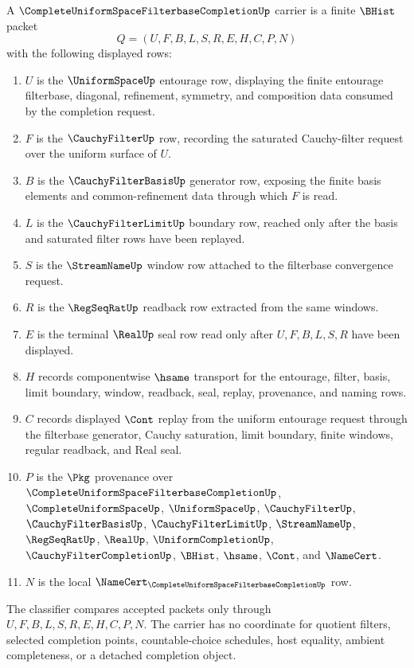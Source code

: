 \begin{definition}
\label{def:complete-uniform-space-filterbase-completion-carrier}
A $\CompleteUniformSpaceFilterbaseCompletionUp$ carrier is a finite $\BHist$ packet
$$
Q=(U,F,B,L,S,R,E,H,C,P,N)
$$
with the following displayed rows:
\begin{enumerate}
\item $U$ is the $\UniformSpaceUp$ entourage row, displaying the finite entourage filterbase, diagonal, refinement, symmetry, and composition data consumed by the completion request.
\item $F$ is the $\CauchyFilterUp$ row, recording the saturated Cauchy-filter request over the uniform surface of $U$.
\item $B$ is the $\CauchyFilterBasisUp$ generator row, exposing the finite basis elements and common-refinement data through which $F$ is read.
\item $L$ is the $\CauchyFilterLimitUp$ boundary row, reached only after the basis and saturated filter rows have been replayed.
\item $S$ is the $\StreamNameUp$ window row attached to the filterbase convergence request.
\item $R$ is the $\RegSeqRatUp$ readback row extracted from the same windows.
\item $E$ is the terminal $\RealUp$ seal row read only after $U,F,B,L,S,R$ have been displayed.
\item $H$ records componentwise $\hsame$ transport for the entourage, filter, basis, limit boundary, window, readback, seal, replay, provenance, and naming rows.
\item $C$ records displayed $\Cont$ replay from the uniform entourage request through the filterbase generator, Cauchy saturation, limit boundary, finite windows, regular readback, and Real seal.
\item $P$ is the $\Pkg$ provenance over $\CompleteUniformSpaceFilterbaseCompletionUp$, $\CompleteUniformSpaceUp$, $\UniformSpaceUp$, $\CauchyFilterUp$, $\CauchyFilterBasisUp$, $\CauchyFilterLimitUp$, $\StreamNameUp$, $\RegSeqRatUp$, $\RealUp$, $\UniformCompletionUp$, $\CauchyFilterCompletionUp$, $\BHist$, $\hsame$, $\Cont$, and $\NameCert$.
\item $N$ is the local $\NameCert_{\CompleteUniformSpaceFilterbaseCompletionUp}$ row.
\end{enumerate}
The classifier compares accepted packets only through $U,F,B,L,S,R,E,H,C,P,N$. The carrier has no coordinate for quotient filters, selected completion points, countable-choice schedules, host equality, ambient completeness, or a detached completion object.
\end{definition}


